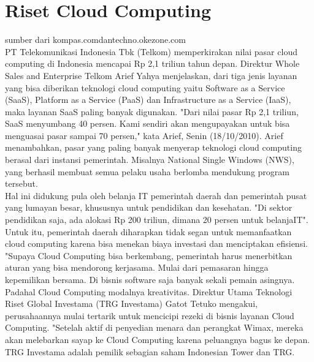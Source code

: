 \section{Riset Cloud Computing}
\tab sumber dari kompas.comdantechno.okezone.com \\
\tab PT Telekomunikasi Indonesia Tbk (Telkom) memperkirakan nilai pasar cloud computing di Indonesia mencapai Rp 2,1 triliun tahun depan. Direktur Whole Sales and Enterprise Telkom Arief Yahya menjelaskan, dari tiga jenis layanan yang bisa diberikan teknologi cloud computing yaitu Software as a Service (SaaS), Platform as a Service (PaaS) dan Infrastructure as a Service (IaaS), maka layanan SaaS paling banyak digunakan. "Dari nilai pasar Rp 2,1 triliun, SaaS menyumbang 40 persen. Kami sendiri akan mengupayakan untuk bisa menguasai pasar sampai 70 persen," kata Arief, Senin (18/10/2010). Arief menambahkan, pasar yang paling banyak menyerap teknologi cloud computing berasal dari instansi pemerintah. Misalnya National Single Windows (NWS), yang berhasil membuat semua pelaku usaha berlomba mendukung program tersebut. \\Hal ini didukung pula oleh belanja IT pemerintah daerah dan pemerintah pusat yang lumayan besar, khususnya untuk pendidikan dan kesehatan. "Di sektor pendidikan saja, ada alokasi Rp 200 triliun, dimana 20 persen untuk belanjaIT". Untuk itu, pemerintah daerah diharapkan tidak segan untuk memanfaatkan cloud computing karena bisa menekan biaya investasi dan menciptakan efisiensi. "Supaya Cloud Computing bisa berkembang, pemerintah harus menerbitkan aturan yang bisa mendorong kerjasama. Mulai dari pemasaran hingga kepemilikan bersama. Di bisnis software saja banyak sekali pemain asingnya. Padahal Cloud Computing modalnya kreativitas. Direktur Utama Teknologi Riset Global Investama (TRG Investama) Gatot Tetuko mengakui, perusahaannya mulai tertarik untuk mencicipi rezeki di bisnis layanan Cloud Computing. "Setelah aktif di penyedian menara dan perangkat Wimax, mereka akan melebarkan sayap ke Cloud Computing karena peluangnya bagus ke depan. TRG Investama adalah pemilik sebagian saham Indonesian Tower dan TRG.
